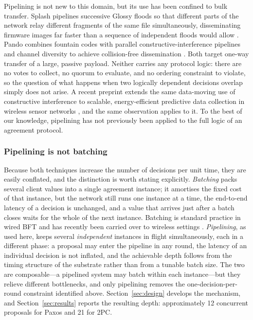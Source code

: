 \documentclass[journal]{IEEEtran}
\begin{document}
Pipelining is not new to this domain, but its use has been confined to
bulk transfer. Splash pipelines successive Glossy floods so that different
parts of the network relay different fragments of the same file
simultaneously, disseminating firmware images far faster than a sequence
of independent floods would allow \cite{doddavenkatappa13splash}. Pando
combines fountain codes with parallel constructive-interference pipelines
and channel diversity to achieve collision-free dissemination
\cite{du17pando}. Both target one-way transfer of a large, passive
payload. Neither carries any protocol logic: there are no votes to
collect, no quorum to evaluate, and no ordering constraint to violate, so
the question of what happens when two logically dependent decisions
overlap simply does not arise. A recent preprint extends the same
data-moving use of constructive interference to scalable,
energy-efficient predictive data collection in wireless sensor networks
\cite{muldoon25stair}, and the same observation applies to it. To the
best of our knowledge, pipelining
has not previously been applied to the full logic of an agreement
protocol.

\subsubsection{Pipelining is not batching}
Because both techniques increase the number of decisions per unit time,
they are easily conflated, and the distinction is worth stating
explicitly. \emph{Batching} packs several client values into a single
agreement instance; it amortises the fixed cost of that instance, but the
network still runs one instance at a time, the end-to-end latency of a
decision is unchanged, and a value that arrives just after a batch closes
waits for the whole of the next instance. Batching is standard practice in
wired BFT and has recently been carried over to wireless settings
\cite{liu25partiallysync}. \emph{Pipelining}, as used here, keeps several
\emph{independent} instances in flight simultaneously, each in a different
phase: a proposal may enter the pipeline in any round, the latency of an
individual decision is not inflated, and the achievable depth follows from
the timing structure of the substrate rather than from a tunable batch
size. The two are composable---a pipelined system may batch within each
instance---but they relieve different bottlenecks, and only pipelining
removes the one-decision-per-round constraint identified above.
Section~\ref{sec:design} develops the mechanism, and
Section~\ref{sec:results} reports the resulting depth: approximately 12
concurrent proposals for Paxos and 21 for 2PC.
\end{document}
